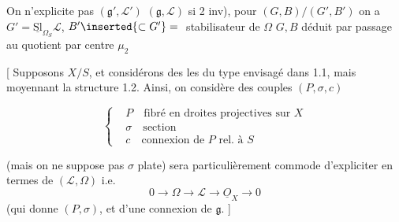 
On n'explicite pas $(\mathfrak g',\mathscr L')$  $(\mathfrak g,\mathscr L)$ si 2 inv), pour $(G,B)/(G',B')$ on a $G'=\underline{\mathrm{Sl}}_{\Omega_S}\mathscr L$, $B'\inserted{\subset G'}={}$ stabilisateur de $\Omega$ $G,B$ déduit par passage au quotient par centre $\mu_2$

[ \uline{} Supposons $X/S$, et considérons des  les  du type envisagé dans 1.1, mais moyennant  la structure 1.2. Ainsi, on considère des couples $(P,\sigma,c)$


\[ \left\{\begin{aligned} &P\quad\text{fibré en droites projectives sur }X\\ &\sigma\quad\text{section}\\&c\quad\text{connexion de }P\text{ rel. à }S\end{aligned}\right. \]

(mais on ne suppose pas $\sigma$ plate)  sera particulièrement commode d'expliciter en termes de $(\mathscr L,\Omega)$ i.e.
\[ 0\longrightarrow\Omega\longrightarrow\mathscr L\longrightarrow\underline O_X\longrightarrow0 \]
(qui donne $(P,\sigma)$,  et d'une connexion de $\mathfrak g$.  ]

